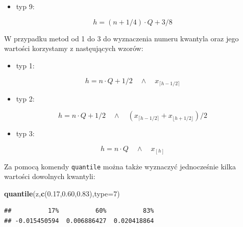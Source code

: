 \documentclass[polish,]{book}
\newenvironment{Shaded}{\begin{snugshade}}{\end{snugshade}}
\newcommand{\DataTypeTok}[1]{\textcolor[rgb]{0.13,0.29,0.53}{#1}}
\newcommand{\DecValTok}[1]{\textcolor[rgb]{0.00,0.00,0.81}{#1}}
\newcommand{\FloatTok}[1]{\textcolor[rgb]{0.00,0.00,0.81}{#1}}
\newcommand{\KeywordTok}[1]{\textcolor[rgb]{0.13,0.29,0.53}{\textbf{#1}}}
\newcommand{\NormalTok}[1]{#1}
\providecommand{\tightlist}{%
  \setlength{\itemsep}{0pt}\setlength{\parskip}{0pt}}
\begin{document}
\begin{itemize}
\tightlist
\item
  typ 9:
\end{itemize}

\begin{equation}
h=(n+1/4)\cdot Q + 3/8
\label{eq:wz910}
\end{equation}

W przypadku metod od 1 do 3 do wyznaczenia numeru kwantyla oraz jego wartości
korzystamy z nastęujących wzorów:

\begin{itemize}
\tightlist
\item
  typ 1:
\end{itemize}

\begin{equation}
h=n\cdot Q +1/2 \quad\wedge\quad x_{\lceil h-1/2\rceil}
\label{eq:wz911}
\end{equation}

\begin{itemize}
\tightlist
\item
  typ 2:
\end{itemize}

\begin{equation}
h=n\cdot Q +1/2 \quad\wedge\quad (x_{\lceil h-1/2\rceil}+x_{\lfloor h+1/2\rfloor})/2
\label{eq:wz912}
\end{equation}

\begin{itemize}
\tightlist
\item
  typ 3:
\end{itemize}

\begin{equation}
h=n\cdot Q \quad\wedge\quad x_{[h]}
\label{eq:wz913}
\end{equation}

Za pomocą komendy \texttt{quantile} można także wyznaczyć jednocześnie kilka wartości
dowolnych kwantyli:

\begin{Shaded}
\begin{Highlighting}[]
\KeywordTok{quantile}\NormalTok{(z,}\KeywordTok{c}\NormalTok{(}\FloatTok{0.17}\NormalTok{,}\FloatTok{0.60}\NormalTok{,}\FloatTok{0.83}\NormalTok{),}\DataTypeTok{type=}\DecValTok{7}\NormalTok{)}
\end{Highlighting}
\end{Shaded}

\begin{verbatim}
##          17%          60%          83% 
## -0.015450594  0.006886427  0.020418864
\end{verbatim}
\end{document}
